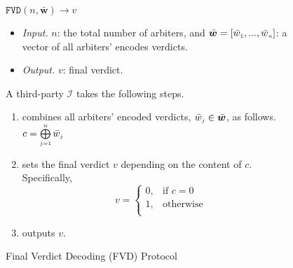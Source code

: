  \vspace{-2mm}
\begin{figure}[!htbp]
\setlength{\fboxsep}{1pt}
\begin{center}
    \begin{tcolorbox}[enhanced,width=5.5in, height=41.5mm,
    drop fuzzy shadow southwest,
    colframe=black,colback=white]
    \small{
    \vspace{-1.3mm}
\underline{$\mathtt{FVD}(n,  \bar{\bm w})\rightarrow  v$}\\
%
\vspace{-2.1mm}
\begin{itemize}
\item \noindent\textit{Input.} $n$:  the total number of  arbiters,  and  $\bar{\bm w}=[\bar{ w}_{\scriptscriptstyle 1},..., \bar{ w}_{\scriptscriptstyle n}]$:  a vector of all arbiters' encodes  verdicts.
%
\item \noindent\textit{Output.} $v$: final verdict.  
%
\end{itemize}
A third-party $\mathcal{I}$ takes the following steps.
    \vspace{-1.3mm}
\begin{enumerate}
%
\item combines  all arbiters' encoded verdicts, $\bar w_{\scriptscriptstyle j}\in \bar{\bm {w}}$, as follows. 
%
$c= \bigoplus\limits^{\scriptscriptstyle n}_{\scriptscriptstyle j=1} \bar w_{\scriptscriptstyle j}$
%
\item sets the final verdict $v$ depending on the content of $c$. Specifically, 
%
\vspace{-1mm}
\begin{equation*}
   v= 
\begin{cases}
    0,              &\text{if } c= 0\\
   1 ,& \text{otherwise }\\
\end{cases}
\end{equation*}
%
\item outputs  $v$. 
\vspace{-1.5mm}
 \end{enumerate}
}
\end{tcolorbox}
\end{center}
\vspace{-2mm}
\caption{Final Verdict Decoding  (FVD) Protocol} 
\label{fig:FVD}
\end{figure}


